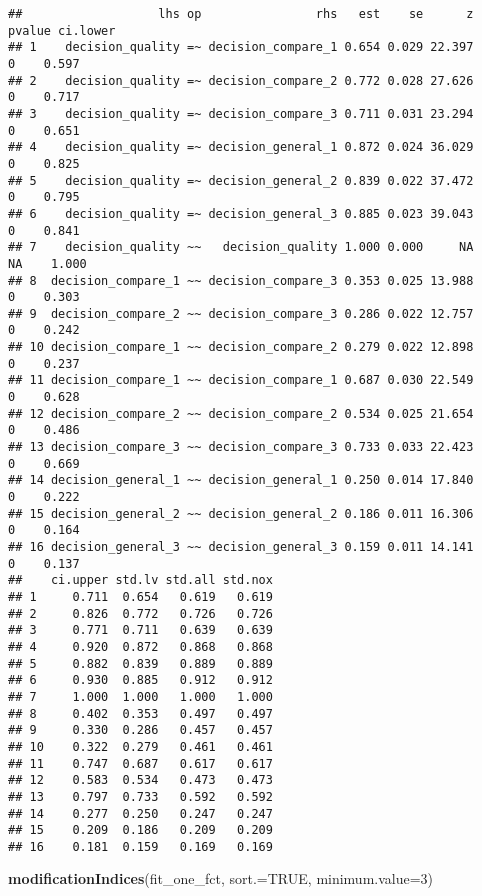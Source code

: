 \documentclass[]{article}
\newenvironment{Shaded}{\begin{snugshade}}{\end{snugshade}}
\newcommand{\DataTypeTok}[1]{\textcolor[rgb]{0.13,0.29,0.53}{#1}}
\newcommand{\DecValTok}[1]{\textcolor[rgb]{0.00,0.00,0.81}{#1}}
\newcommand{\KeywordTok}[1]{\textcolor[rgb]{0.13,0.29,0.53}{\textbf{#1}}}
\newcommand{\NormalTok}[1]{#1}
\newcommand{\OtherTok}[1]{\textcolor[rgb]{0.56,0.35,0.01}{#1}}
\begin{document}
\begin{verbatim}
##                   lhs op                rhs   est    se      z pvalue ci.lower
## 1    decision_quality =~ decision_compare_1 0.654 0.029 22.397      0    0.597
## 2    decision_quality =~ decision_compare_2 0.772 0.028 27.626      0    0.717
## 3    decision_quality =~ decision_compare_3 0.711 0.031 23.294      0    0.651
## 4    decision_quality =~ decision_general_1 0.872 0.024 36.029      0    0.825
## 5    decision_quality =~ decision_general_2 0.839 0.022 37.472      0    0.795
## 6    decision_quality =~ decision_general_3 0.885 0.023 39.043      0    0.841
## 7    decision_quality ~~   decision_quality 1.000 0.000     NA     NA    1.000
## 8  decision_compare_1 ~~ decision_compare_3 0.353 0.025 13.988      0    0.303
## 9  decision_compare_2 ~~ decision_compare_3 0.286 0.022 12.757      0    0.242
## 10 decision_compare_1 ~~ decision_compare_2 0.279 0.022 12.898      0    0.237
## 11 decision_compare_1 ~~ decision_compare_1 0.687 0.030 22.549      0    0.628
## 12 decision_compare_2 ~~ decision_compare_2 0.534 0.025 21.654      0    0.486
## 13 decision_compare_3 ~~ decision_compare_3 0.733 0.033 22.423      0    0.669
## 14 decision_general_1 ~~ decision_general_1 0.250 0.014 17.840      0    0.222
## 15 decision_general_2 ~~ decision_general_2 0.186 0.011 16.306      0    0.164
## 16 decision_general_3 ~~ decision_general_3 0.159 0.011 14.141      0    0.137
##    ci.upper std.lv std.all std.nox
## 1     0.711  0.654   0.619   0.619
## 2     0.826  0.772   0.726   0.726
## 3     0.771  0.711   0.639   0.639
## 4     0.920  0.872   0.868   0.868
## 5     0.882  0.839   0.889   0.889
## 6     0.930  0.885   0.912   0.912
## 7     1.000  1.000   1.000   1.000
## 8     0.402  0.353   0.497   0.497
## 9     0.330  0.286   0.457   0.457
## 10    0.322  0.279   0.461   0.461
## 11    0.747  0.687   0.617   0.617
## 12    0.583  0.534   0.473   0.473
## 13    0.797  0.733   0.592   0.592
## 14    0.277  0.250   0.247   0.247
## 15    0.209  0.186   0.209   0.209
## 16    0.181  0.159   0.169   0.169
\end{verbatim}

\begin{Shaded}
\begin{Highlighting}[]
\KeywordTok{modificationIndices}\NormalTok{(fit_one_fct, }\DataTypeTok{sort.=}\OtherTok{TRUE}\NormalTok{, }\DataTypeTok{minimum.value=}\DecValTok{3}\NormalTok{)}
\end{Highlighting}
\end{Shaded}
\end{document}
